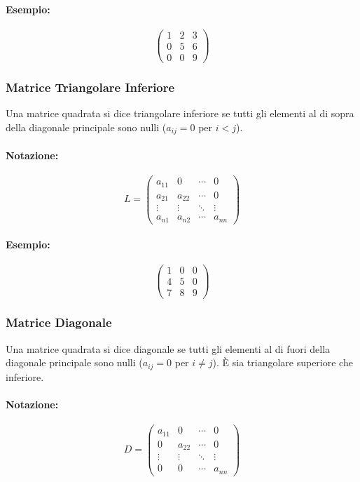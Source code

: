 \documentclass{article}
\begin{document}
\paragraph{Esempio:}
\[ \begin{pmatrix}
1 & 2 & 3 \\
0 & 5 & 6 \\
0 & 0 & 9
\end{pmatrix} \]

\subsubsection*{Matrice Triangolare Inferiore}
Una matrice quadrata si dice triangolare inferiore se tutti gli elementi al di sopra della diagonale principale sono nulli ($a_{ij} = 0$ per $i<j$).
\paragraph{Notazione:}
\[ L = \begin{pmatrix}
a_{11} & 0 & \cdots & 0 \\
a_{21} & a_{22} & \cdots & 0 \\
\vdots & \vdots & \ddots & \vdots \\
a_{n1} & a_{n2} & \cdots & a_{nn}
\end{pmatrix} \]
\paragraph{Esempio:}
\[ \begin{pmatrix}
1 & 0 & 0 \\
4 & 5 & 0 \\
7 & 8 & 9
\end{pmatrix} \]

\subsubsection*{Matrice Diagonale}
Una matrice quadrata si dice diagonale se tutti gli elementi al di fuori della diagonale principale sono nulli ($a_{ij} = 0$ per $i \neq j$). È sia triangolare superiore che inferiore.
\paragraph{Notazione:}
\[ D = \begin{pmatrix}
a_{11} & 0 & \cdots & 0 \\
0 & a_{22} & \cdots & 0 \\
\vdots & \vdots & \ddots & \vdots \\
0 & 0 & \cdots & a_{nn}
\end{pmatrix} \]
\end{document}
